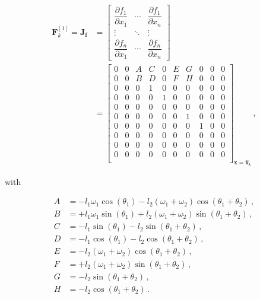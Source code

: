 \begin{equation}
\begin{split}
\mathbf{F}^{[1]}_k = \mathbf{J}_{\mathbf{f}} &= \begin{bmatrix}
    \dfrac{\partial f_1}{\partial x_1} & \cdots & \dfrac{\partial f_1}{\partial x_{n}}\\
    \vdots & \ddots & \vdots\\
    \dfrac{\partial f_{n}}{\partial x_1} & \cdots & \dfrac{\partial f_{n}}{\partial x_{n}} \end{bmatrix} \\
&=\begin{bmatrix}
  0 & 0 & A & C & 0 & E & G & 0 & 0 & 0\\
  0 & 0 & B & D & 0 & F & H & 0 & 0 & 0\\
  0 & 0 & 0 & 1 & 0 & 0 & 0 & 0 & 0 & 0\\
  0 & 0 & 0 & 0 & 1 & 0 & 0 & 0 & 0 & 0\\
  0 & 0 & 0 & 0 & 0 & 0 & 0 & 0 & 0 & 0\\
  0 & 0 & 0 & 0 & 0 & 0 & 1 & 0 & 0 & 0\\
  0 & 0 & 0 & 0 & 0 & 0 & 0 & 1 & 0 & 0\\
  0 & 0 & 0 & 0 & 0 & 0 & 0 & 0 & 0 & 0\\
  0 & 0 & 0 & 0 & 0 & 0 & 0 & 0 & 0 & 0\\
  0 & 0 & 0 & 0 & 0 & 0 & 0 & 0 & 0 & 0\\
\end{bmatrix}_{\mathbf{x}=\hat{\mathbf{x}}_{k}}\,,
\end{split}
\end{equation}

\noindent
with

\begin{equation*}
  \begin{split}
  	A &= -l_1 \omega_1 \cos(\theta_1) -l_2 (\omega_1 + \omega_2) \cos(\theta_1 + \theta_2)\,, \\
  	B &= +l_1 \omega_1 \sin(\theta_1) +l_2 (\omega_1 + \omega_2) \sin(\theta_1 + \theta_2)\,, \\
  	C &= -l_1 \sin(\theta_1) -l_2 \sin (\theta_1 + \theta_2)\,, \\
  	D &= -l_1 \cos(\theta_1) - l_2 \cos (\theta_1 + \theta_2)\,, \\
  	E &= -l_2 (\omega_1 + \omega_2) \cos(\theta_1+ \theta_2)\,, \\
  	F &= +l_2 (\omega_1 + \omega_2) \sin(\theta_1+ \theta_2)\,, \\
    G &= -l_2 \sin (\theta_1 + \theta_2)\,, \\
    H &= -l_2 \cos (\theta_1 + \theta_2)\,.
  \end{split}
\end{equation*}

